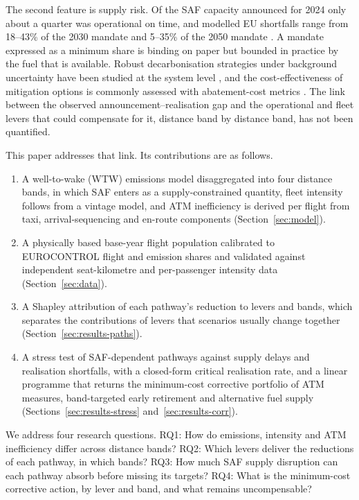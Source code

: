 \documentclass[preprint, 12pt, authoryear]{elsarticle}
\begin{document}
The second feature is supply risk. Of the SAF capacity announced for 2024 only
about a quarter was operational on time, and modelled EU shortfalls range from
18--43\% of the 2030 mandate and 5--35\% of the 2050 mandate
\citep{martulli2025}. A mandate expressed as a minimum share is binding on
paper but bounded in practice by the fuel that is available. Robust
decarbonisation strategies under background uncertainty have been studied at
the system level \citep{costaalves2026, dray2022, bergero2023}, and the
cost-effectiveness of mitigation options is commonly assessed with
abatement-cost metrics \citep{schafer2016, salgas2025}. The link between the
observed announcement--realisation gap and the operational and fleet levers
that could compensate for it, distance band by distance band, has not been
quantified.

This paper addresses that link. Its contributions are as follows.
\begin{enumerate}
  \item A well-to-wake (WTW) emissions model disaggregated into four distance
  bands, in which SAF enters as a supply-constrained quantity, fleet intensity
  follows from a vintage model, and ATM inefficiency is derived per flight from
  taxi, arrival-sequencing and en-route components
  (Section~\ref{sec:model}).
  \item A physically based base-year flight population calibrated to
  EUROCONTROL flight and emission shares and validated against independent
  seat-kilometre and per-passenger intensity data (Section~\ref{sec:data}).
  \item A Shapley attribution of each pathway's reduction to levers and bands,
  which separates the contributions of levers that scenarios usually change
  together (Section~\ref{sec:results-paths}).
  \item A stress test of SAF-dependent pathways against supply delays and
  realisation shortfalls, with a closed-form critical realisation rate, and a
  linear programme that returns the minimum-cost corrective portfolio of ATM
  measures, band-targeted early retirement and alternative fuel supply
  (Sections~\ref{sec:results-stress} and~\ref{sec:results-corr}).
\end{enumerate}
We address four research questions. RQ1: How do emissions, intensity and ATM
inefficiency differ across distance bands? RQ2: Which levers deliver the
reductions of each pathway, in which bands? RQ3: How much SAF supply disruption
can each pathway absorb before missing its targets? RQ4: What is the
minimum-cost corrective action, by lever and band, and what remains
uncompensable?
\end{document}
